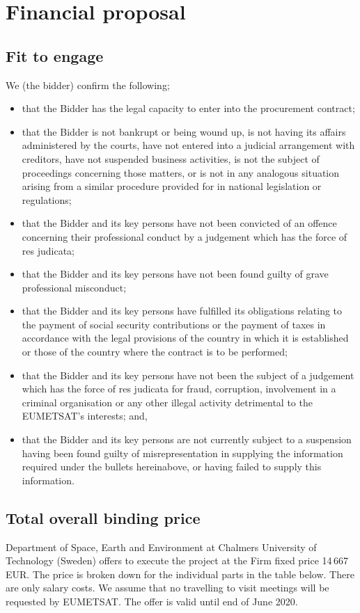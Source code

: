 \documentclass[BCOR=1cm,12pt,bibliography=totoc]{article}
\begin{document}
\newpage
\section{Financial proposal}
%
\subsection{Fit to engage}
%
We (the bidder) confirm the following;
\begin{itemize}
\item that the Bidder has the legal capacity to enter into the procurement contract;
\item that the Bidder is not bankrupt or being wound up, is not having its affairs
administered by the courts, have not entered into a judicial arrangement with creditors,
have not suspended business activities, is not the subject of proceedings concerning
those matters, or is not in any analogous situation arising from a similar procedure
provided for in national legislation or regulations;
\item that the Bidder and its key persons have not been convicted of an offence
concerning their professional conduct by a judgement which has the force of res judicata;
\item that the Bidder and its key persons have not been found guilty of grave
professional misconduct;
\item that the Bidder and its key persons have fulfilled its obligations relating to the
payment of social security contributions or the payment of taxes in accordance with the
legal provisions of the country in which it is established or those of the country where
the contract is to be performed;
\item that the Bidder and its key persons have not been the subject of a judgement which
has the force of res judicata for fraud, corruption, involvement in a criminal organisation
or any other illegal activity detrimental to the EUMETSAT’s interests; and,
\item that the Bidder and its key persons are not currently subject to a suspension
having been found guilty of misrepresentation in supplying the information required
under the bullets hereinabove, or having failed to supply this information.
\end{itemize}


\subsection{Total overall binding price}
%
Department of Space, Earth and Environment at Chalmers University of Technology
(Sweden) offers to execute the project at the Firm fixed price 14\,667 EUR. The
price is broken down for the individual parts in the table below. There are
only salary costs. We assume that no travelling to visit meetings will be
requested by EUMETSAT.
The offer is valid until end of June 2020.\\
\end{document}
